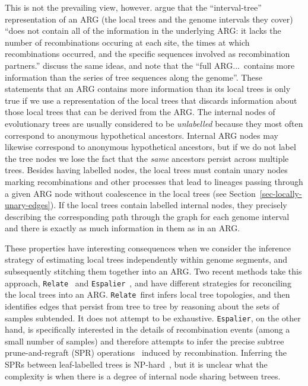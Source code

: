 \documentclass{article}
\newcommand{\relate}[0]{\texttt{Relate}}
\newcommand{\espalier}[0]{\texttt{Espalier}}
\begin{document}
This is not the prevailing view, however.
\cite{kuhner2017consensus} argue that the
``interval-tree'' representation of
an ARG (the local trees and the genome intervals they cover)
``does not contain all of the information in the underlying ARG: it lacks the
number of recombinations occuring at each site, the times at which
recombinations occurred, and the specific sequences involved as recombination
partners.''
\cite{shipilina2023origin} discuss the same ideas,
and note that the
``full ARG...~contains more information than the series of tree
sequences along the genome''.
These statements that an ARG
contains more information than its local trees is only true
if we use a representation of the local trees that discards
information about those local trees that can be derived from the ARG.
The internal nodes of evolutionary trees are usually
considered to be \emph{unlabelled}
because they most often correspond
to anonymous hypothetical ancestors.
Internal ARG nodes may likewise correspond to anonymous hypothetical
ancestors, but if we do not label the tree nodes we lose the fact that
the \emph{same} ancestors persist across multiple trees.
Besides having labelled nodes, the local trees must contain
unary nodes marking recombinations
and other processes that lead to lineages passing through a given
ARG node without coalescence in the local trees
(see Section~\ref{sec-locally-unary-edges}).
If the local trees contain labelled internal nodes, they precisely
describing the corresponding path through the graph for each
genome interval and there is exactly as
much information in them as in an ARG.

These properties have interesting consequences when we
consider the inference strategy of estimating local trees
independently within genome segments,
and subsequently stitching them together into an ARG.
Two recent methods take this approach,
\relate~\citep{speidel2019method} and
\espalier~\citep{rasmussen2022espalier},
and have different strategies for reconciling the local trees into an ARG.
\relate\ first infers local tree topologies, and then identifies
edges that persist from tree to tree by reasoning about the sets of samples
subtended. It does not attempt to be exhaustive.
\espalier, on the other hand, is specifically interested
in the details of recombination events (among a small number of samples)
and therefore attempts to infer
the precise subtree prune-and-regraft (SPR)
operations~\citep{hein1990reconstructing,song2003on,song2006properties}
induced by recombination.
Inferring the SPRs between leaf-labelled trees is
NP-hard~\citep{hein1996complexity,allen2001subtree,bordewich2005computational},
but it is unclear what the complexity is when there
is a degree of internal node sharing between trees.
\end{document}
